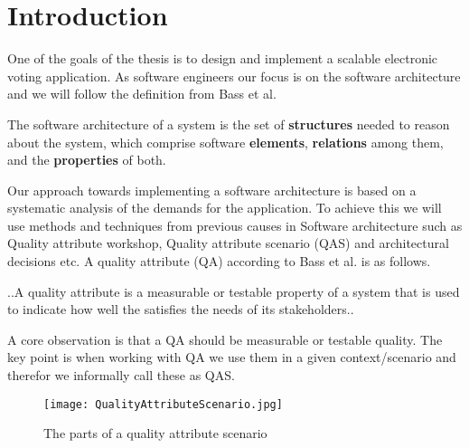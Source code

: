 \section{Introduction}
One of the goals of the thesis is to design and implement a scalable electronic voting application. As software engineers our focus is on the software architecture and we will follow the definition from Bass et al. 


\begin{defi}
The software architecture of a system is the set of \textbf{structures} needed to reason about the system, which comprise software \textbf{elements}, \textbf{relations} among them, and the \textbf{properties} of both.  \cite{Bass}
\end{defi}

\noindent
Our approach towards implementing a software architecture is based on a systematic analysis of the demands for the application. To achieve this we will use methods and techniques from previous causes in Software architecture such as  Quality attribute workshop, Quality attribute scenario (QAS) and architectural decisions etc. A quality attribute (QA) according to Bass et al. is as follows.


\begin{defi}
..A quality attribute is a measurable or testable property of a system that is used to indicate how well the satisfies the needs of its stakeholders..  \cite{Bass}
\end{defi}

\noindent
A core observation is that a QA should be measurable or testable quality. The key point is when working with QA we use them in a given context/scenario and therefor we informally call these as QAS.\\


\begin{figure}[H]
\centering
\texttt{[image: QualityAttributeScenario.jpg]}

\caption{The parts of a quality attribute scenario}
\label{fig:Quality_Attribute_Scenario}
\end{figure}





